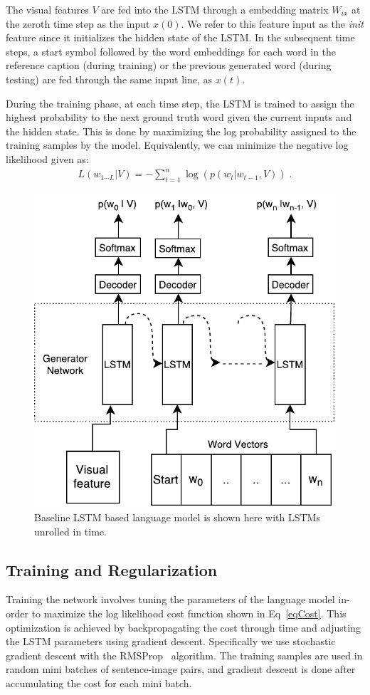 The visual features $V$ are fed into the LSTM through a
embedding matrix $W_{ix}$ at the zeroth time step as the input $x(0)$.
We refer to this feature input as the \emph{init} feature since it
initializes the hidden state of the LSTM.
In the subsequent time steps, a start symbol followed by the word
embeddings for each word in the reference caption (during training) or
the previous generated word (during testing) are fed through the same
input line, as $x(t)$.

During the training phase, at each time step, the LSTM is trained to
assign the highest probability to the next ground truth word given the
current inputs and the hidden state.
This is done by maximizing the log probability assigned to the training 
samples by the model. Equivalently, we can minimize the negative log likelihood 
given as:
\begin{align}
  \label{eqCost}
  L(w_{1\cdots L} | V) = -\sum_{t=1}^n \log(p(w_t|w_{t-1},V)) \; .
\end{align}
\begin{figure}[h]
\begin{center}
   \includegraphics[width=0.5\linewidth]{images/Thesis_lstmLangGen.pdf}
\end{center}
\vspace*{-4mm}
\caption{Baseline LSTM based language model is shown here with
  LSTMs unrolled in time.}
\label{fig:baselinelstmlang}
\end{figure}

\subsection{Training and Regularization}
Training the network involves tuning the parameters of the language model
in-order to maximize the log likelihood cost function shown in Eq~\ref{eqCost}.
This optimization is achieved by backpropagating the cost through time and
adjusting the LSTM parameters using gradient descent.
Specifically we use stochastic gradient descent with the
RMSProp~\cite{rmspropTielman} algorithm.
The training samples are used in random mini batches of sentence-image pairs,
and gradient descent is done after accumulating the cost for each mini batch. 

